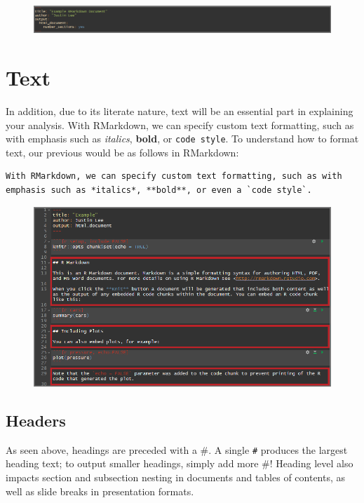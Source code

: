 \documentclass[]{book}
\theoremstyle{definition}
\theoremstyle{definition}
\theoremstyle{remark}
\begin{document}
\begin{figure}[htbp]
\centering
\includegraphics{images/yaml_number_sections.png}
\caption{}
\end{figure}

\section{Text}\label{text}

In addition, due to its literate nature, text will be an essential part
in explaining your analysis. With RMarkdown, we can specify custom text
formatting, such as with emphasis such as \emph{italics}, \textbf{bold},
or \texttt{code\ style}. To understand how to format text, our previous
would be as follows in RMarkdown:

\begin{verbatim}
With RMarkdown, we can specify custom text formatting, such as with emphasis such as *italics*, **bold**, or even a `code style`.
\end{verbatim}

\begin{figure}[htbp]
\centering
\includegraphics{images/rmd_text.png}
\caption{}
\end{figure}

\subsection{Headers}\label{headers}

As seen above, headings are preceded with a \#. A single \texttt{\#}
produces the largest heading text; to output smaller headings, simply
add more \#! Heading level also impacts section and subsection nesting
in documents and tables of contents, as well as slide breaks in
presentation formats.
\end{document}
